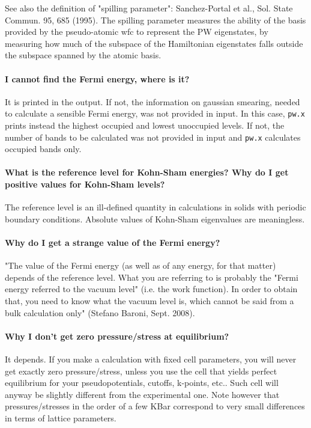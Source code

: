 \documentclass[12pt,a4paper]{article}
\def\pw.x{\texttt{pw.x}}
\begin{document}
See also the definition of "spilling parameter": Sanchez-Portal et
al., Sol. State Commun. 95, 685 (1995). The spilling parameter
measures the ability of the basis provided by the pseudo-atomic wfc to
represent the PW eigenstates, by measuring how much of the subspace of
the Hamiltonian eigenstates falls outside the subspace spanned by the
atomic basis. 

\paragraph{I cannot find the Fermi energy, where is it?}  

It is printed in the output. If not, the information on gaussian smearing,
needed to calculate a sensible Fermi energy, was not provided in input.
In this case, \pw.x prints instead the highest occupied and lowest
unoccupied levels. If not, the number of bands to be calculated was not 
provided in input and \pw.x calculates occupied bands only.

\paragraph{What is the reference level for Kohn-Sham energies? 
Why do I get positive values for Kohn-Sham levels?}

The reference level is an ill-defined quantity in calculations
in solids with periodic boundary conditions. Absolute values of
Kohn-Sham eigenvalues are meaningless. 

\paragraph{Why do I get a strange value of the Fermi energy?}

"The value of the Fermi energy (as well as of any energy, for that
matter) depends of the reference level. What you are referring to is
probably the "Fermi energy referred to the vacuum level" (i.e.  
the work function). In order to obtain that, you need to know what the
vacuum level is, which cannot be said from a bulk calculation only"
(Stefano Baroni, Sept. 2008). 

\paragraph{Why I don't get zero pressure/stress at equilibrium?}

It depends. If you make a calculation with fixed cell parameters, you
will never get exactly zero pressure/stress, unless you use the cell
that yields perfect equilibrium for your pseudopotentials,  cutoffs,
k-points, etc.. Such cell will anyway be slightly different from the
experimental one. Note however that pressures/stresses in the order of
a few KBar correspond to very small differences in terms of lattice parameters.
\end{document}
